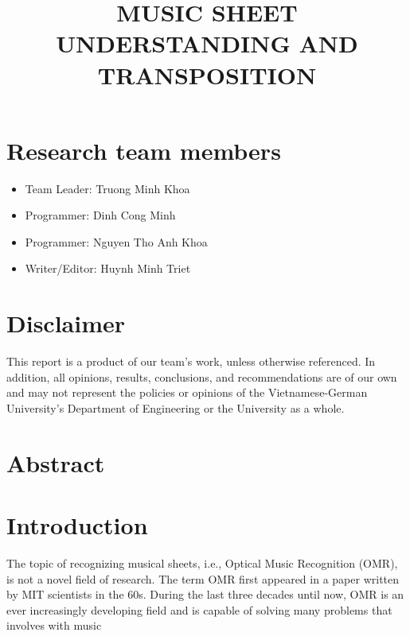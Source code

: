 \documentclass[a4paper,12pt]{report}
\title{ MUSIC SHEET UNDERSTANDING AND TRANSPOSITION}
\author{}
\begin{document}
\afterpage{\null\newpage}

\maketitle

\tableofcontents

\clearpage

\section{Research team members}
\begin{itemize}
	\item Team Leader:      \hfill Truong Minh Khoa
	\item Programmer: 		\hfill Dinh Cong Minh
	\item Programmer:		\hfill Nguyen Tho Anh Khoa
	\item Writer/Editor:	\hfill Huynh Minh Triet
\end{itemize}


\section{Disclaimer} 
This report is a product of our team's work, unless otherwise referenced. In
addition, all opinions, results, conclusions, and recommendations are of our own
and may not represent the policies or opinions of the Vietnamese-German
University's Department of Engineering or the University as a whole. 

\clearpage

\section{Abstract}




\section{Introduction}

The topic of recognizing musical sheets, i.e., Optical Music Recognition (OMR),
is not a novel field of research. The term OMR first appeared in a paper written
by MIT scientists in the 60s.  During the last three decades until now, OMR is
an ever increasingly developing field and is capable of solving many problems
that involves with music
\end{document}
